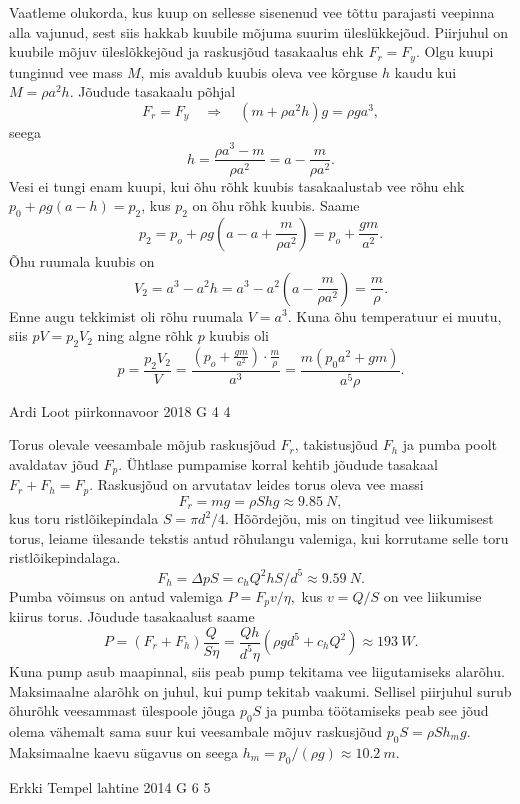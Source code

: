 \documentclass[11pt, twoside]{article}
\begin{document}
{{\ifSolution
Vaatleme olukorda, kus kuup on sellesse sisenenud vee tõttu parajasti veepinna alla vajunud, sest siis hakkab kuubile mõjuma suurim üleslükkejõud. Piirjuhul on kuubile mõjuv üleslõkkejõud ja raskusjõud tasakaalus ehk $F_r = F_y$. Olgu kuupi tunginud vee mass $M$, mis avaldub kuubis oleva vee kõrguse $h$ kaudu kui $M = \rho a^2h$. Jõudude tasakaalu põhjal
\[
F_r = F_y \quad\Rightarrow\quad (m + \rho a^2h)g=\rho ga^3,
\]
seega
\[
h = \frac{\rho a^3 - m}{\rho a^2} = a - \frac{m}{\rho a^2}.
\]
Vesi ei tungi enam kuupi, kui õhu rõhk kuubis tasakaalustab vee rõhu ehk $p_0 + \rho g(a-h) = p_2$, kus $p_2$ on õhu rõhk kuubis. Saame
\[
p_2 = p_o + \rho g\left(a - a + \frac{m}{\rho a^2}\right) = p_o + \frac{gm}{a^2}.
\]
Õhu ruumala kuubis on
\[
V_2 = a^3 - a^2h = a^3 - a^2\left(a - \frac{m}{\rho a^2}\right) = \frac{m}{\rho}.
\]
Enne augu tekkimist oli rõhu ruumala $V=a^3$. Kuna õhu temperatuur ei muutu, siis $pV = p_2V_2$ ning algne rõhk $p$ kuubis oli
\[
p = \frac{p_2V_2}{V} = \frac{ \left( p_o + \frac{gm}{a^2} \right) \cdot \frac{m}{\rho}}{a^3} = \frac{m(p_0a^2 + gm)}{a^5\rho}.
\]
\fi
}

{Ardi Loot} %
{piirkonnavoor} %
{2018} %
{G 4} %
{4} %
{

\ifSolution
\osa Torus olevale veesambale mõjub raskusjõud $F_{r}$, takistusjõud $F_{h}$
ja pumba poolt avaldatav jõud $F_{p}$. Ühtlase pumpamise korral
kehtib jõudude tasakaal $F_{r}+F_{h}=F_{p}$. Raskusjõud on
arvutatav leides torus oleva vee massi
\[
F_{r}=mg=\rho Shg\approx\SI{9.85}{N},
\]
kus toru ristlõikepindala $S=\pi d^{2}/4.$ Hõõrdejõu, mis
on tingitud vee liikumisest torus, leiame ülesande tekstis antud rõhulangu
valemiga, kui korrutame selle toru ristlõikepindalaga.
\[
F_{h}=\Delta pS=c_{h}Q^{2}hS/d^{5}\approx\SI{9.59}{N}.
\]
Pumba võimsus on antud valemiga $P=F_{p}v/\eta,$ kus $v=Q/S$
on vee liikumise kiirus torus. Jõudude tasakaalust saame
\[
P=\left(F_{r}+F_{h}\right)\frac{Q}{S\eta}=\frac{Qh}{d^{5}\eta}\left(\rho gd^{5}+c_{h}Q^{2}\right)\approx\SI{193}{W}.
\]
\osa Kuna pump asub maapinnal, siis peab pump tekitama vee liigutamiseks
alarõhu. Maksimaalne alarõhk on juhul, kui pump tekitab vaakumi.
Sellisel piirjuhul surub õhurõhk veesammast ülespoole jõuga $p_{0}S$
ja pumba töötamiseks peab see jõud olema vähemalt sama suur kui veesambale
mõjuv raskusjõud $p_{0}S=\rho Sh_{m}g.$ Maksimaalne kaevu sügavus
on seega $h_{m}=p_{0}/\left(\rho g\right)\approx\SI{10.2}{m}$.
\fi
}

{Erkki Tempel} %
{lahtine} %
{2014} %
{G 6} %
{5} %
{

}}
\end{document}

